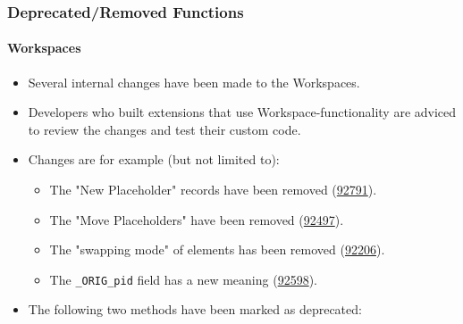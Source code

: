 %

\begin{frame}[fragile]
	\frametitle{Deprecated/Removed Functions}
	\framesubtitle{Workspaces}

	\begin{itemize}
		\item Several internal changes have been made to the Workspaces.
		\item Developers who built extensions that use Workspace-functionality
			are adviced to review the changes and test their custom code.
		\item Changes are for example (but not limited to):

			\begin{itemize}\small
				\item The "New Placeholder" records have been removed
					(\href{https://docs.typo3.org/c/typo3/cms-core/master/en-us/Changelog/11.0/Breaking-92791-NewPlaceholderRecordsRemovedInWorkspaces.html}{92791}).
				\item The "Move Placeholders" have been removed
					(\href{https://docs.typo3.org/c/typo3/cms-core/master/en-us/Changelog/11.0/Breaking-92497-WorkspacesMovePlaceholdersRemoved.html}{92497}).
				\item The "swapping mode" of elements has been removed
					(\href{https://docs.typo3.org/c/typo3/cms-core/master/en-us/Changelog/11.0/Breaking-92206-RemoveWorkspaceSwappingOfElements.html}{92206}).
				\item The \texttt{\_ORIG\_pid} field has a new meaning
					(\href{https://docs.typo3.org/c/typo3/cms-core/master/en-us/Changelog/11.0/Breaking-92598-Workspace-overlaysAuto-fixThePIDValueForMovedRecords.html}{92598}).
			\end{itemize}

		\item The following two methods have been marked as deprecated:


\end{itemize}
\end{frame}
